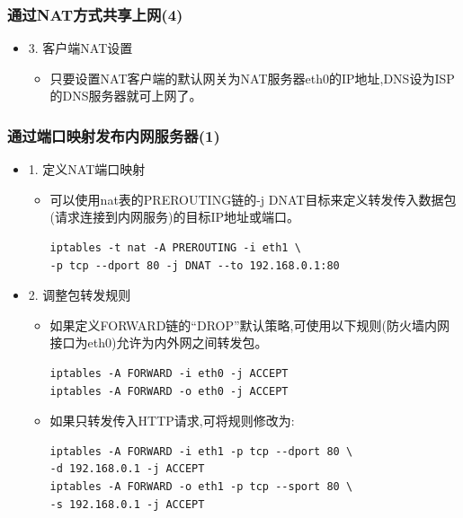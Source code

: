 \documentclass[xcolor=svgnames,presentation]{beamer}
\begin{document}
\begin{frame}
\frametitle{通过NAT方式共享上网(4)}
\label{sec-3-7}
\begin{itemize}

\item 3. 客户端NAT设置
\label{sec-3-7-1}%
\begin{itemize}

\item 只要设置NAT客户端的默认网关为NAT服务器eth0的IP地址,DNS设为ISP的DNS服务器就可上网了。
\label{sec-3-7-1-1}%
\end{itemize} %
\end{itemize} %
\end{frame}
\begin{frame}[fragile]
\frametitle{通过端口映射发布内网服务器(1)}
\label{sec-3-8}
\begin{itemize}

\item 1. 定义NAT端口映射
\label{sec-3-8-1}%
\begin{itemize}

\item 可以使用nat表的PREROUTING链的-j DNAT目标来定义转发传入数据包(请求连接到内网服务)的目标IP地址或端口。\\
\label{sec-3-8-1-1}%
\begin{verbatim}
iptables -t nat -A PREROUTING -i eth1 \
-p tcp --dport 80 -j DNAT --to 192.168.0.1:80
\end{verbatim}
\end{itemize} %

\item 2. 调整包转发规则
\label{sec-3-8-2}%
\begin{itemize}

\item 如果定义FORWARD链的“DROP”默认策略,可使用以下规则(防火墙内网接口为eth0)允许为内外网之间转发包。\\
\label{sec-3-8-2-1}%
\begin{verbatim}
iptables -A FORWARD -i eth0 -j ACCEPT
iptables -A FORWARD -o eth0 -j ACCEPT
\end{verbatim}

\item 如果只转发传入HTTP请求,可将规则修改为:\\
\label{sec-3-8-2-2}%
\begin{verbatim}
iptables -A FORWARD -i eth1 -p tcp --dport 80 \
-d 192.168.0.1 -j ACCEPT
iptables -A FORWARD -o eth1 -p tcp --sport 80 \
-s 192.168.0.1 -j ACCEPT
\end{verbatim}
\end{itemize} %
\end{itemize} %
\end{frame}
\end{document}
